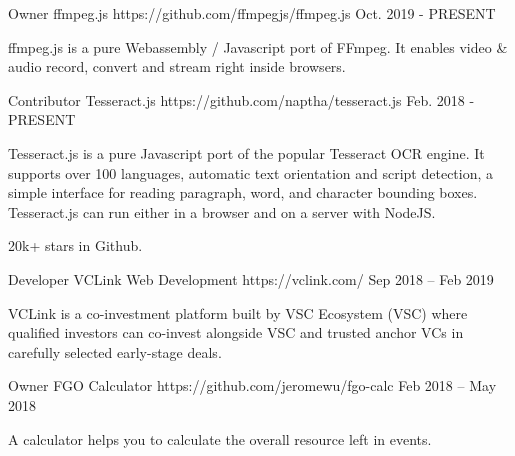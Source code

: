 

\begin{cventries}

  \cventry
    {Owner} %
    {ffmpeg.js} %
    {https://github.com/ffmpegjs/ffmpeg.js} %
    {Oct. 2019 - PRESENT} %
    {
      \begin{cvitems} %
        \item {ffmpeg.js is a pure Webassembly / Javascript port of FFmpeg. It enables video \& audio record, convert and stream right inside browsers.}
      \end{cvitems}
    }

  \cventry
    {Contributor} %
    {Tesseract.js} %
    {https://github.com/naptha/tesseract.js} %
    {Feb. 2018 - PRESENT} %
    {
      \begin{cvitems} %
        \item {Tesseract.js is a pure Javascript port of the popular Tesseract OCR engine. It supports over 100 languages, automatic text orientation and script detection, a simple interface for reading paragraph, word, and character bounding boxes. Tesseract.js can run either in a browser and on a server with NodeJS.}
        \item {20k+ stars in Github.}
      \end{cvitems}
    }

  \cventry
    {Developer} %
    {VCLink Web Development} %
    {https://vclink.com/} %
    {Sep 2018 – Feb 2019} %
    {
      \begin{cvitems} %
        \item {VCLink is a co-investment platform built by VSC Ecosystem (VSC) where qualified investors can co-invest alongside VSC and trusted anchor VCs in carefully selected early-stage deals.}
      \end{cvitems}
    }

  \cventry
    {Owner} %
    {FGO Calculator} %
    {https://github.com/jeromewu/fgo-calc} %
    {Feb 2018 – May 2018} %
    {
      \begin{cvitems} %
        \item {A calculator helps you to calculate the overall resource left in events.}
      \end{cvitems}
    }

\end{cventries}
